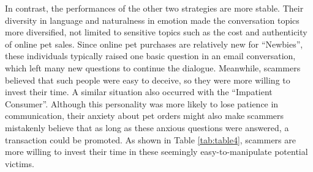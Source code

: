 \documentclass[ oneside,%
                    author={Cassie Qing Tang},
                    degree={BSc},
                     title={An Automated Response System for Disrupting Online Pet Scamming \\ },
                    subtitle={ }]{dissertation}
\begin{document}
In contrast, the performances of the other two strategies are more stable. Their diversity in language and naturalness in emotion made the conversation topics more diversified, not limited to sensitive topics such as the cost and authenticity of online pet sales. Since online pet purchases are relatively new for “Newbies”, these individuals typically raised one basic question in an email conversation, which left many new questions to continue the dialogue. Meanwhile, scammers believed that such people were easy to deceive, so they were more willing to invest their time. A similar situation also occurred with the “Impatient Consumer”. Although this personality was more likely to lose patience in communication, their anxiety about pet orders might also make scammers mistakenly believe that as long as these anxious questions were answered, a transaction could be promoted. As shown in Table \ref{tab:table4}, scammers are more willing to invest their time in these seemingly easy-to-manipulate potential victims.
\\
\end{document}
